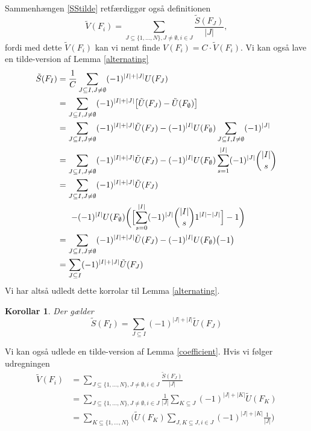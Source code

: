\documentclass[a4paper, 12pt]{article}
\newtheorem{korollar}{Korollar}
\begin{document}
Sammenhængen \eqref{SStilde} retfærdiggør også definitionen
\begin{equation}
\tilde V(F_i)=\sum_{J\subseteq\{1,\dots, N\}, J\neq \emptyset, i\in J} \frac{\tilde S(F_J)}{|J|},
\end{equation}
fordi med dette $\tilde V(F_i)$ kan vi nemt finde $V(F_i)=C\cdot \tilde V(F_i)$. Vi kan også lave en tilde-version af Lemma \ref{alternating}
\begin{align*}
\tilde S(F_I)&=\frac{1}{C}\sum_{J\subseteq I, J\neq \emptyset} (-1)^{|I|+|J|} U(F_J)\\
&=\sum_{J\subseteq I, J\neq \emptyset} (-1)^{|I|+|J|} \bigl[\tilde U(F_J)-\tilde U(F_{\emptyset})\bigr]\\
&=\sum_{J\subseteq I, J\neq \emptyset} (-1)^{|I|+|J|} \tilde U(F_J) -(-1)^{|I|}U(F_{\emptyset})\sum_{J\subseteq I, I\neq \emptyset} (-1)^{|J|}\\
&=\sum_{J\subseteq I, J\neq \emptyset} (-1)^{|I|+|J|} \tilde U(F_J) -(-1)^{|I|}U(F_{\emptyset})\sum_{s=1}^{|I|} (-1)^{|J|}{|I| \choose s}\\
&=\begin{lgathered}[t]\sum_{J\subseteq I, J\neq \emptyset} (-1)^{|I|+|J|} \tilde U(F_J)\\ \,\,-(-1)^{|I|}U(F_{\emptyset})\biggl(\Bigl[\sum_{s=0}^{|I|} (-1)^{|J|}{|I| \choose s}1^{|I|-|J|}\Bigr]-1\biggr)\end{lgathered}\\
&=\sum_{J\subseteq I, J\neq \emptyset} (-1)^{|I|+|J|} \tilde U(F_J) -(-1)^{|I|}U(F_{\emptyset})\bigl(-1\bigr)\\
&=\sum_{J\subseteq I} (-1)^{|I|+|J|} \tilde U(F_J)
\end{align*}
Vi har altså udledt dette korrolar til Lemma \ref{alternating}.
\begin{korollar}\label{alternating_tilde}
Der gælder
\begin{equation}
\tilde S(F_I)=\sum_{J\subseteq I} (-1)^{|J|+|I|} \tilde U(F_J)
\end{equation}
\end{korollar}
Vi kan også udlede en tilde-version af Lemma \ref{coefficient}. Hvis vi følger udregningen
\begin{align}
\tilde V(F_i)&=\sum_{J\subseteq\{1,\dots, N\}, J\neq \emptyset, i\in J} \frac{\tilde S(F_J)}{|J|}\nonumber\\
&=\sum_{J\subseteq\{1,\dots, N\}, J\neq \emptyset, i\in J}  \frac{1}{|J|}\sum_{K\subseteq J} (-1)^{|J|+|K|} \tilde U(F_K)\nonumber\\
&=\sum_{K\subseteq \{1, \dots, N\}} \biggl( \tilde U(F_K)\sum_{J, K\subseteq J, i\in J} (-1)^{|J|+|K|} \frac{1}{|J|}\biggr)
\end{align}
\end{document}
